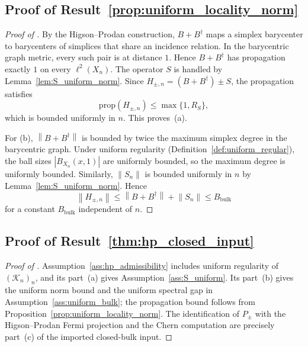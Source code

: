 \documentclass[11pt]{article}
\numberwithin{equation}{section}
\theoremstyle{definition}
\theoremstyle{remark}
\newcommand{\K}{\mathcal{K}}
\newcommand{\opnorm}[1]{\left\lVert#1\right\rVert}
\begin{document}
\subsection{Proof of Result~\ref{prop:uniform_locality_norm}}\label{app:proof:prop:uniform_locality_norm}
\begin{proof}[Proof of ]
By the Higson--Prodan construction, $B+B^\dagger$ maps a simplex barycenter to barycenters of
simplices that share an incidence relation. In the barycentric graph metric, every such pair is at
distance $1$. Hence $B+B^\dagger$ has propagation exactly $1$ on every $\ell^2(X_n)$. The operator
$S$ is handled by Lemma~\ref{lem:S_uniform_norm}. Since
$H_{\pm,n}=(B+B^\dagger)\pm S$, the propagation satisfies
\[
\mathrm{prop}(H_{\pm,n})\le \max\{1,R_S\},
\]
which is bounded uniformly in $n$. This proves~(a).

For (b), $\opnorm{B+B^\dagger}$ is bounded by twice the maximum simplex degree in the
barycentric graph. Under uniform regularity (Definition~\ref{def:uniform_regular}), the ball sizes
$|B_{X_n}(x,1)|$ are uniformly bounded, so the maximum degree is uniformly bounded. Similarly,
$\opnorm{S_n}$ is bounded uniformly in $n$ by Lemma~\ref{lem:S_uniform_norm}. Hence
\[
\opnorm{H_{\pm,n}}\le \opnorm{B+B^\dagger}+\opnorm{S_n}\le B_{\mathrm{bulk}}
\]
for a constant $B_{\mathrm{bulk}}$ independent of $n$.
\end{proof}

\subsection{Proof of Result~\ref{thm:hp_closed_input}}\label{app:proof:thm:hp_closed_input}
\begin{proof}[Proof of ]
Assumption~\ref{ass:hp_admissibility} includes uniform regularity of $(\K_n)_n$, and its part~(a)
gives Assumption~\ref{ass:S_uniform}. Its part~(b) gives the uniform norm bound and the uniform
spectral gap in Assumption~\ref{ass:uniform_bulk}; the propagation bound follows from
Proposition~\ref{prop:uniform_locality_norm}. The identification of \(P_\pm\) with the
Higson--Prodan Fermi projection and the Chern computation are precisely part~(c) of the imported
closed-bulk input.
\end{proof}
\end{document}
